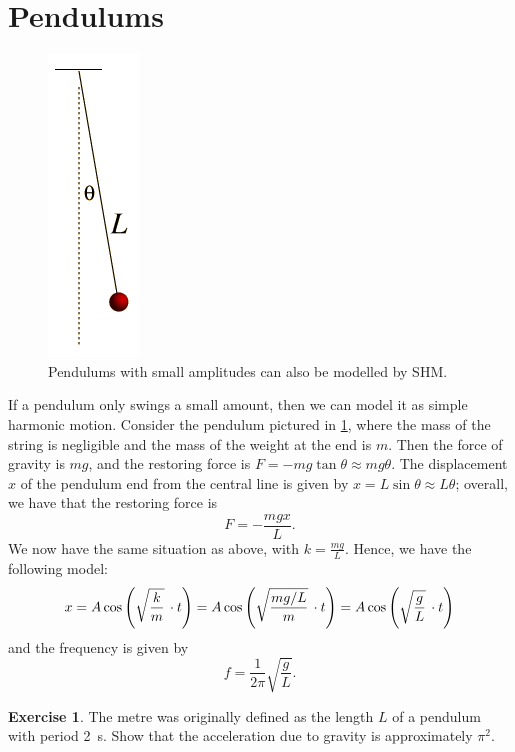 \documentclass[a4paper]{amsbook}
\newcommand{\marginsymbol}{}
\theoremstyle{definition}
\newtheorem{exercise}{Exercise}
\numberwithin{exercise}{chapter}
\numberwithin{exercise}{chapter}
\begin{document}
\section{Pendulums}
\begin{figure}
  \centering
  \includegraphics[height=0.25\textheight]{pendulum}
  \caption{Pendulums with small amplitudes can also be modelled by SHM.\label{fig:pendulum}}
\end{figure}
\marginsymbol If a pendulum only swings a small amount, then we can model it as simple harmonic motion. Consider the pendulum pictured
in \cref{fig:pendulum}, where the mass of the string is negligible and the mass of the weight at the end is $ m $. Then
the force of gravity is $ mg $, and the restoring force is $ F = -mg \tan \theta \approx mg \theta $. The displacement $ x $ of the
pendulum end from the central line is given by $ x = L \sin \theta \approx L \theta $; overall, we have that the restoring force is
\begin{displaymath}
  F = -\frac{mgx}{L}.
\end{displaymath}
We now have the same situation as above, with $ k = \frac{mg}{L} $. Hence, we have the following model:
\begin{displaymath}
  x = A \cos\left(\sqrt{\frac{k}{m}} \thinspace\cdot t\right) = A \cos\left(\sqrt{\frac{mg/L}{m}} \thinspace\cdot t\right)
    = A \cos\left(\sqrt{\frac{g}{L}} \thinspace\cdot t\right)
\end{displaymath}
and the frequency is given by
\begin{equation}
  f = \frac{1}{2\pi} \sqrt{\frac{g}{L}}.
\end{equation}

\begin{exercise}
  The metre was originally defined as the length $ L $ of a pendulum with period \SI{2}{\second}. Show that the acceleration due to gravity
  is approximately $ \pi^2 $.
\end{exercise}
\end{document}
